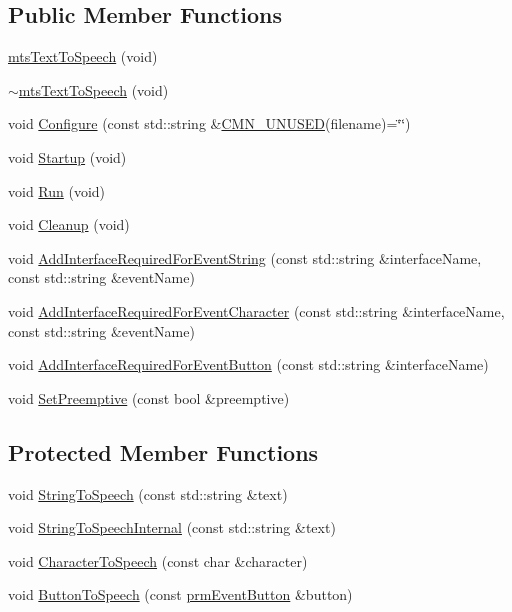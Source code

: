 \subsection*{Public Member Functions}
\begin{DoxyCompactItemize}
\item 
\hyperlink{classmts_text_to_speech_a9522af18806f0a7db41b744a3fca01be}{mts\+Text\+To\+Speech} (void)
\item 
\hyperlink{classmts_text_to_speech_a8640f37ee556b1de2ec39e5b99acbeb7}{$\sim$mts\+Text\+To\+Speech} (void)
\item 
void \hyperlink{classmts_text_to_speech_a7ac4d804f9e043bf877ea37138867687}{Configure} (const std\+::string \&\hyperlink{cmn_portability_8h_a021894e2626935fa2305434b1e893ff6}{C\+M\+N\+\_\+\+U\+N\+U\+S\+E\+D}(filename)=\char`\"{}\char`\"{})
\item 
void \hyperlink{classmts_text_to_speech_a68ada4f3cb8b578dcd535ae485fd576c}{Startup} (void)
\item 
void \hyperlink{classmts_text_to_speech_a9c724a185cfff331ccb781e16e4ed5b5}{Run} (void)
\item 
void \hyperlink{classmts_text_to_speech_ad8cedd061a3c8de77984d1e4f92acbcb}{Cleanup} (void)
\item 
void \hyperlink{classmts_text_to_speech_ab7d9d96da97ae6efe79be8be8c016514}{Add\+Interface\+Required\+For\+Event\+String} (const std\+::string \&interface\+Name, const std\+::string \&event\+Name)
\item 
void \hyperlink{classmts_text_to_speech_a1b9cc162cb293515534462dbeae0e164}{Add\+Interface\+Required\+For\+Event\+Character} (const std\+::string \&interface\+Name, const std\+::string \&event\+Name)
\item 
void \hyperlink{classmts_text_to_speech_a94cc67298b5ac7c6c9f739deb2c34f0a}{Add\+Interface\+Required\+For\+Event\+Button} (const std\+::string \&interface\+Name)
\item 
void \hyperlink{classmts_text_to_speech_af64ec5a504b4172cff06208f8c1e5553}{Set\+Preemptive} (const bool \&preemptive)
\end{DoxyCompactItemize}
\subsection*{Protected Member Functions}
\begin{DoxyCompactItemize}
\item 
void \hyperlink{classmts_text_to_speech_a853ce06b633030fd9f8d1aba3fbd6a8a}{String\+To\+Speech} (const std\+::string \&text)
\item 
void \hyperlink{classmts_text_to_speech_afb7bc9e687ccf8057e0ecf8b16e1c829}{String\+To\+Speech\+Internal} (const std\+::string \&text)
\item 
void \hyperlink{classmts_text_to_speech_a75f1f94a974a3c7cfe84c74b9a07c857}{Character\+To\+Speech} (const char \&character)
\item 
void \hyperlink{classmts_text_to_speech_aa9376ca24fd38dce907df77a61c15753}{Button\+To\+Speech} (const \hyperlink{classprm_event_button}{prm\+Event\+Button} \&button)
\end{DoxyCompactItemize}
